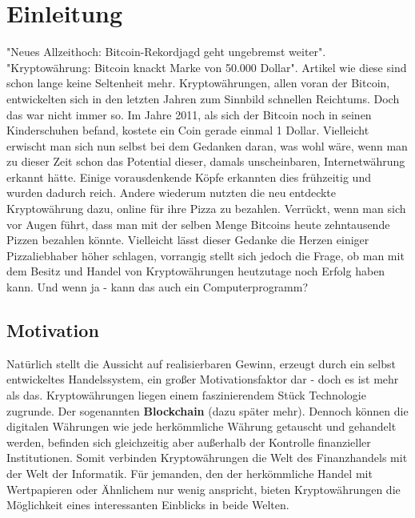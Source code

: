 \documentclass[oneside]{ausarbeitung}
\begin{document}
\cleardoublepage
{}
\setcounter{page}{1}

\chapter{Einleitung}
\label{cha:einleitung}

"Neues Allzeithoch: Bitcoin-Rekordjagd geht ungebremst weiter"\cite{bitcoin_artikel_1}. "Kryptowährung: Bitcoin knackt Marke von 50.000 Dollar"\cite{bitcoin_artikel_2}. Artikel wie diese sind schon lange keine Seltenheit mehr. Kryptowährungen, allen voran der Bitcoin, entwickelten sich in den letzten Jahren zum Sinnbild schnellen Reichtums. Doch das war nicht immer so. Im Jahre 2011, als sich der Bitcoin noch in seinen Kinderschuhen befand, kostete ein Coin gerade einmal 1 Dollar\cite{bitcoin_kurs_2011}. Vielleicht erwischt man sich nun selbst bei dem Gedanken daran, was wohl wäre, wenn man zu dieser Zeit schon das Potential dieser, damals unscheinbaren, Internetwährung erkannt hätte. Einige vorausdenkende Köpfe erkannten dies frühzeitig und wurden dadurch reich. Andere wiederum nutzten die neu entdeckte Kryptowährung dazu, online für ihre Pizza zu bezahlen. Verrückt, wenn man sich vor Augen führt, dass man mit der selben Menge Bitcoins heute zehntausende Pizzen bezahlen könnte. Vielleicht lässt dieser Gedanke die Herzen einiger Pizzaliebhaber höher schlagen, vorrangig stellt sich jedoch die Frage, ob man mit dem Besitz und Handel von Kryptowährungen heutzutage noch Erfolg haben kann. Und wenn ja - kann das auch ein Computerprogramm?

\section{Motivation}
\label{sec:motivation}

Natürlich stellt die Aussicht auf realisierbaren Gewinn, erzeugt durch ein selbst entwickeltes Handelssystem, ein großer Motivationsfaktor dar - doch es ist mehr als das. Kryptowährungen liegen einem faszinierendem Stück Technologie zugrunde. Der sogenannten \textbf{Blockchain} (dazu später mehr). Dennoch können die digitalen Währungen wie jede herkömmliche Währung getauscht und gehandelt werden, befinden sich gleichzeitig aber außerhalb der Kontrolle finanzieller Institutionen. Somit verbinden Kryptowährungen die Welt des Finanzhandels mit der Welt der Informatik. Für jemanden, den der herkömmliche Handel mit Wertpapieren oder Ähnlichem nur wenig anspricht, bieten Kryptowährungen die Möglichkeit eines interessanten Einblicks in beide Welten. 
\end{document}
